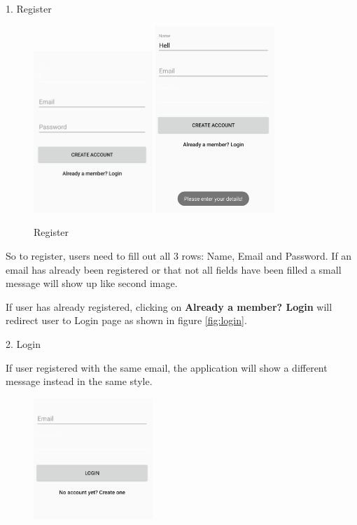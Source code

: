 \documentclass{article}
\begin{document}
\begin{flushleft}
{\large 1. Register}\par
\clearpage
\begin{figure}[H]
	\includegraphics[width=0.40\textwidth]{register}
	\hfill
	\includegraphics[width=0.40\textwidth]{register2}
	\caption{Register}
	\label{fig:register}
\end{figure}
So to register, users need to fill out all 3 rows: Name, Email and Password. If an email has already been registered or that not all fields have been filled a small message will show up like second image.\par
If user has already registered, clicking on \textbf{Already a member? Login} will redirect user to Login page as shown in figure \ref{fig:login}.\par
{\large 2. Login}\par
If user registered with the same email, the application will show a different message instead in the same style.\par
\begin{figure}[H]
	\centering
	\includegraphics[width=0.40\textwidth]{login}

\end{figure}
\end{flushleft}
\end{document}
